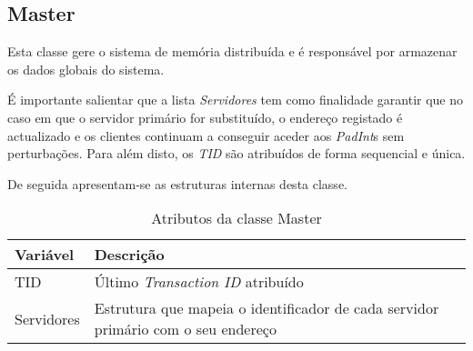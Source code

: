 \subsection{Master}

Esta classe gere o sistema de memória distribuída e é responsável por armazenar os dados globais do sistema.

É importante salientar que a lista \textit{Servidores} tem como finalidade garantir que no caso em que o servidor primário for substituído, o endereço registado é actualizado e os clientes continuam a conseguir aceder aos \textit{PadInt}s sem perturbações. Para além disto, os \textit{TID} são atribuídos de forma sequencial e única. 

De seguida apresentam-se as estruturas internas desta classe.
\begin{table}[H]
\centering
\begin{tabular}{| p{2cm} | p{5cm} |}
\hline
\textbf{Variável} & \textbf{Descrição} \\
\hline
TID & Último \textit{Transaction ID} atribuído \\
\hline
Servidores & Estrutura que mapeia o identificador de cada servidor primário com o seu endereço \\
\hline
\end{tabular}
\caption{Atributos da classe Master}
\end{table}

